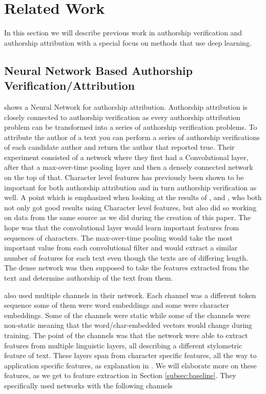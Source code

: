 \section{Related Work} \label{sec:related_work}

In this section we will describe previous work in authorship verification and
authorship attribution with a special focus on methods that use deep learning.


\subsection{Neural Network Based Authorship Verification/Attribution}

\citet{DBLP:journals/corr/RuderGB16c} shows a Neural Network for authorship
attribution. Authorship attribution is closely connected to authorship
verification as every authorship attribution problem can be transformed into a
series of authorship verification problems. To attribute the author of a text
you can perform a series of authorship verifications of each candidate author
and return the author that reported true. Their experiment consisted of a
network where they first had a Convolutional layer, after that a max-over-time
pooling layer and then a densely connected network on the top of that.
Character level features has previously been shown to be important for both
authorship attribution and in turn authorship verification as well. A point
which is emphasized when looking at the results of \citet{hansen2014}, and
\citet{aalykke2016}, who both not only got good results using Character level
features, but also did so working on data from the same source as we did during
the creation of this paper. The hope was that the convolutional layer would
learn important features from sequences of characters. The max-over-time pooling
would take the most important value from each convolutional filter and would
extract a similar number of features for each text even though the texts are
of differing length. The dense network was then supposed to take the features
extracted from the text and determine authorship of the text from them.

\citet{DBLP:journals/corr/RuderGB16c} also used multiple channels in their
network. Each channel was a different token sequence some of them were word
embeddings and some were character embeddings. Some of the channels were static
while some of the channels were non-static meaning that the word/char-embedded
vectors would change during training. The point of the channels was that the
network were able to extract features from multiple linguistic layers, all
describing a different stylometric feature of text. These layers span from
character specific features, all the way to application specific features, as
explanation in \citet[Section 2]{stamatos2009}. We will elaborate more on these
features, as we get to feature extraction in Section \ref{subsec:baseline}.
They specifically used networks with the following channels


